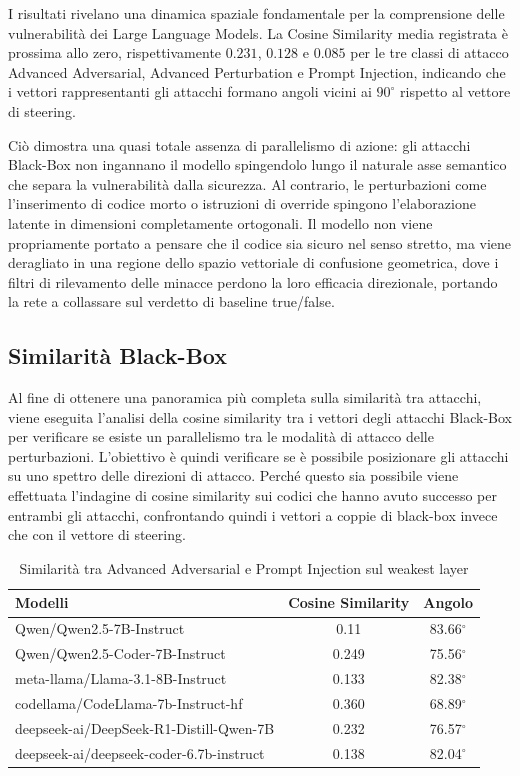 I risultati rivelano una dinamica spaziale fondamentale per la comprensione delle vulnerabilità dei Large Language Models. La Cosine Similarity media registrata è prossima allo zero, rispettivamente $0.231$, $0.128$ e $0.085$ per le tre classi di attacco Advanced Adversarial, Advanced Perturbation e Prompt Injection, indicando che i vettori rappresentanti gli attacchi formano angoli vicini ai $90^\circ$ rispetto al vettore di steering.

Ciò dimostra una quasi totale assenza di parallelismo di azione: gli attacchi Black-Box non ingannano il modello spingendolo lungo il naturale asse semantico che separa la vulnerabilità dalla sicurezza. Al contrario, le perturbazioni come l'inserimento di codice morto o istruzioni di override spingono l'elaborazione latente in dimensioni completamente ortogonali. Il modello non viene propriamente portato a pensare che il codice sia sicuro nel senso stretto, ma viene deragliato in una regione dello spazio vettoriale di confusione geometrica, dove i filtri di rilevamento delle minacce perdono la loro efficacia direzionale, portando la rete a collassare sul verdetto di baseline true/false.

\subsection{Similarità Black-Box}
Al fine di ottenere una panoramica più completa sulla similarità tra attacchi, viene eseguita l'analisi della cosine similarity tra i vettori degli attacchi Black-Box per verificare se esiste un parallelismo tra le modalità di attacco delle perturbazioni.
L'obiettivo è quindi verificare se è possibile posizionare gli attacchi su uno spettro delle direzioni di attacco.
Perché questo sia possibile viene effettuata l'indagine di cosine similarity sui codici che hanno avuto successo per entrambi gli attacchi, confrontando quindi i vettori a coppie di black-box invece che con il vettore di steering. 

\begin{table}[H]
    \centering
    \begin{tabular}{l c c }
        \toprule
        \textbf{Modelli} & \textbf{Cosine Similarity} & \textbf{Angolo} \\
        \midrule
        Qwen/Qwen2.5-7B-Instruct                 & 0.11  & 83.66$^\circ$ \\
        Qwen/Qwen2.5-Coder-7B-Instruct           & 0.249  & 75.56$^\circ$ \\
        meta-llama/Llama-3.1-8B-Instruct         & 0.133 & 82.38$^\circ$ \\
        codellama/CodeLlama-7b-Instruct-hf       & 0.360  & 68.89$^\circ$ \\
        deepseek-ai/DeepSeek-R1-Distill-Qwen-7B  & 0.232  & 76.57$^\circ$ \\
        deepseek-ai/deepseek-coder-6.7b-instruct & 0.138 & 82.04$^\circ$ \\
        \bottomrule
    \end{tabular}
    \vspace{0.2cm}
    \caption{Similarità tra Advanced Adversarial e Prompt Injection sul weakest layer}
    \label{tab:esito_iso_AA_PI}
\end{table}

